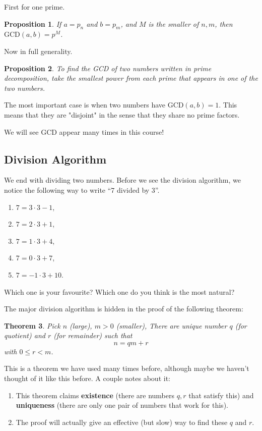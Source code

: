 \documentclass[11pt]{article}
\newtheorem{thm}{Theorem}
\newtheorem{prop}[thm]{Proposition}
\theoremstyle{definition}
\numberwithin{thm}{section}
\begin{document}
First for one prime.

\begin{prop} If $a = p_n$ and $b = p_m$, and $M$ is the \textit{smaller} of $n,m$, then $\text{GCD}(a,b) = p^M$.
\end{prop}

Now in full generality.

\begin{prop} To find the GCD of two numbers written in prime decomposition, take the smallest power from each prime that appears in one of the two numbers.
\end{prop}

The most important case is when two numbers have $\text{GCD}(a,b) = 1$. This means that they are "disjoint" in the sense that they share no prime factors.

We will see GCD appear many times in this course!

\subsection{Division Algorithm}

We end with dividing two numbers. Before we see the division algorithm, we notice the following way to write ``7 divided by 3''.
\begin{enumerate}
	\item $7 = 3 \cdot 3 - 1$,
	\item $7 = 2 \cdot 3 + 1$,
    \item $7 = 1 \cdot 3 + 4$,
    \item $7 = 0 \cdot 3 + 7$,
    \item $7 = -1 \cdot 3 + 10$.
\end{enumerate}

Which one is your favourite? Which one do you think is the most natural?

The major division algorithm is hidden in the proof of the following theorem:

\begin{thm} Pick $n$ (large), $m > 0$ (smaller), There are unique number $q$ (for quotient) and $r$ (for remainder) such that
\[
	n = qm + r
\]
with $0 \leq r < m$.
\end{thm}

This is a theorem we have used many times before, although maybe we haven't thought of it like this before. A couple notes about it:
\begin{enumerate}
	\item This theorem claims \textbf{existence} (there are numbers $q,r$ that satisfy this) and \textbf{uniqueness} (there are only one pair of numbers that work for this).
    \item The proof will actually give an effective (but slow) way to find these $q$ and $r$.
\end{enumerate}
\end{document}
